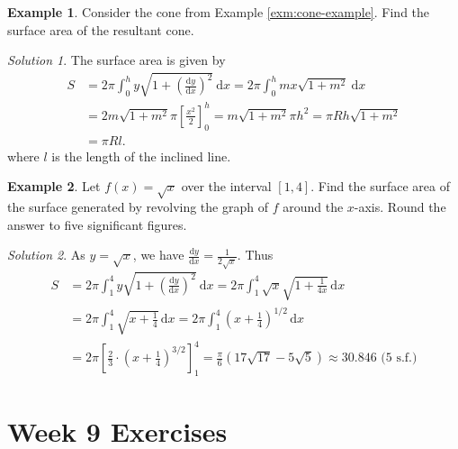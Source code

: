 \documentclass[
  english,
  11pt,
  oneside]{book}
\newcommand{\slide}{}
\theoremstyle{definition}
\theoremstyle{definition}
\newtheorem{example}{Example}[chapter]
\theoremstyle{definition}
\theoremstyle{definition}
\theoremstyle{remark}
\newtheorem*{solution}{Solution}
\begin{document}
\begin{example}
Consider the cone from Example \ref{exm:cone-example}.
Find the surface area of the resultant cone.
\end{example}

\begin{solution}
The surface area is given by
\begin{align*}
S&= 2\pi\int_0^hy\sqrt{1+\left(\frac{\mathrm{d}y}{\mathrm{d}x}\right)^2}\ \mathrm{d}x = 2\pi\int_0^h mx\sqrt{1+m^2}\ \mathrm{d}x\\
&= 2m\sqrt{1+m^2}\pi\left[\frac{x^2}2\right]_0^h = m\sqrt{1+m^2}\pi h^2 = \pi R h\sqrt{1+m^2}\\
&= \pi Rl.
\end{align*}
where \(l\) is the length of the inclined line.
\end{solution}

\slide

\begin{example}
Let \(f(x)=\sqrt{x}\) over the interval \([1,4]\). Find the surface area of the surface generated by revolving the graph of \(f\) around the \(x\)-axis. Round the answer to five significant figures.
\end{example}

\begin{solution}
As \(y=\sqrt{x}\), we have \(\frac{\mathrm{d}y}{\mathrm{d}x} = \frac{1}{2\sqrt{x}}\). Thus
\begin{align*}
S&=2\pi\int_{1}^{4} y\sqrt{1+\left(\frac{\mathrm{d}y}{\mathrm{d}x}\right)^2}\ \mathrm{d}x
= 2\pi\int_{1}^{4} \sqrt{x}\sqrt{1+\frac{1}{4x}}\,\mathrm{d}x\\
&= 2\pi\int_{1}^{4} \sqrt{x+\frac{1}{4}}\,\mathrm{d}x
= 2\pi\int_{1}^{4} \left(x+\frac{1}{4}\right)^{1/2}\,\mathrm{d}x\\
&= 2\pi \left[\frac{2}{3}\cdot\left(x+\frac{1}{4}\right)^{3/2} \right]_{1}^{4}
= \frac{\pi}{6}\left(17\sqrt{17} - 5\sqrt{5}\right)
\approx 30.846 \text{ (5 s.f.)}
\end{align*}
\end{solution}

\begin{slidesonly}

\slide

\hbox{}
\slide

\end{slidesonly}

\chapter*{Week 9 Exercises}\label{week-9-exercises}
\end{document}
